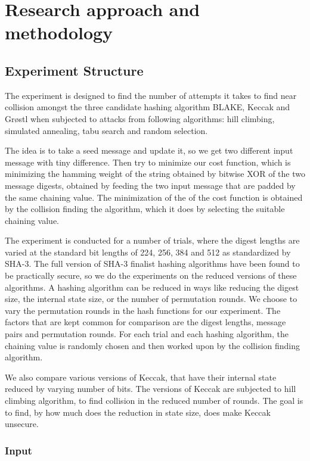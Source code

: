 \chapter{Research approach and methodology}

\section{Experiment Structure}

The experiment is designed to find the number of attempts it takes to find near collision amongst the three
candidate hashing algorithm BLAKE, Keccak and Gr{\o}stl when subjected to attacks from following algorithms:
hill climbing, simulated annealing, tabu search and random selection. 

The idea is to take a seed message and update it, so we get two different input message with tiny difference. 
Then try to minimize our cost function, which is minimizing the hamming weight of the string obtained by bitwise
XOR of the two message digests, obtained by feeding the two input message that are padded by the same chaining 
value. The minimization of the of the cost function is obtained by the collision finding the algorithm, which 
it does by selecting the suitable chaining value.

The experiment is conducted for a number of trials, where the digest lengths are varied at the standard bit
lengths of 224, 256, 384 and 512 as standardized by SHA-3. The full version of SHA-3 finalist hashing algorithms
have been found to be practically secure, so we do the experiments on the reduced versions of these algorithms.
A hashing algorithm can be reduced in ways like reducing the digest size, the internal state size, or the
number of permutation rounds. We choose to vary the permutation rounds in the hash functions for our experiment.
The factors that are kept common for comparison are the digest lengths, message pairs and permutation rounds.
For each trial and each hashing algorithm, the chaining value is randomly chosen and then worked upon by
the collision finding algorithm.

We also compare various versions of Keccak, that have their internal state reduced by varying number of bits. 
The versions of Keccak are subjected to hill climbing algorithm, to find collision in the reduced number of
rounds. The goal is to find, by how much does the reduction in state size, does make Keccak unsecure.

\subsection{Input}

